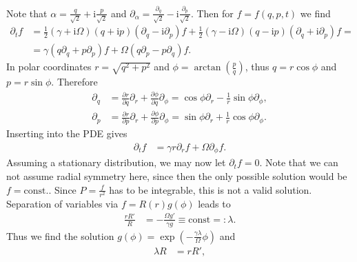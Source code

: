 \documentclass[english, parskip=full]{scrartcl}
\newcommand{\kla}{}
\newcommand{\tecxt}{}
\renewcommand{\i}{\text{i}}
\begin{document}
Note that $\alpha = \frac{q}{\sqrt{2}} + \i\frac{p}{\sqrt{2}}$ and $\partial_\alpha = \frac{\partial_q}{\sqrt{2}} - \i\frac{\partial_p}{\sqrt{2}}$.
Then for $f= f(q,p,t)$ we find
\begin{align}
\partial_t f &= \frac{1}{2}(\gamma + \i\Omega) \kla\left( q + \i p \right) \kla\left( \partial_q - \i \partial_p \right) f + \frac{1}{2} (\gamma - \i\Omega) \kla\left( q - \i p \right) \kla\left( \partial_q + \i \partial_p \right) f = \\
&= \gamma \kla\left( q\partial_q + p\partial_p \right)f + \Omega \kla\left( q\partial_p - p\partial_q \right)f .
\end{align}
In polar coordinates $r = \sqrt{q^2 + p^2}$ and $\phi = \arctan\kla\left( \frac{p}{q} \right)$, thus $q = r\cos\phi$ and $p = r\sin\phi$.
Therefore 
\begin{align}
\partial_q &= \frac{\partial r}{\partial q} \partial_r + \frac{\partial \phi}{\partial q} \partial_\phi = \cos\phi\partial_r - \frac{1}{r}\sin\phi \partial_\phi, \\
\partial_p &= \frac{\partial r}{\partial p} \partial_r + \frac{\partial \phi}{\partial p} \partial_\phi = \sin\phi\partial_r + \frac{1}{r}\cos\phi \partial_\phi.
\end{align}
Inserting into the PDE gives
\begin{align}
\partial_t f &= \gamma  r\partial_r f +  \Omega \partial_\phi f.
\end{align}
Assuming a stationary distribution, we may now let $\partial_t f=0$.
Note that we can not assume radial symmetry here, since then the only possible solution would be $f = \tecxt\text{const.}$.
Since $P = \frac{f}{r^2}$ has to be integrable, this is not a valid solution.
Separation of variables via $f = R(r)g(\phi)$ leads to
\begin{align}
\frac{rR'}{R} &=  -  \frac{\Omega g'}{\gamma g} \equiv \tecxt\text{const} =: \lambda .
\end{align}
Thus we find the solution $g(\phi) = \exp\kla\left( -\frac{\gamma\lambda}{\Omega}\phi \right)$ and 
\begin{align}
\lambda R &= rR',
\end{align}
\end{document}
